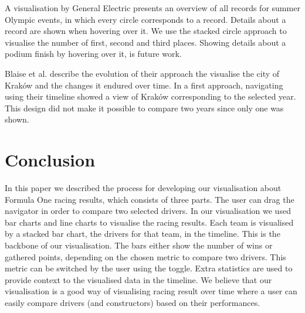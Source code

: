 \documentclass{sigchi}
\begin{document}
A visualisation by General Electric\cite{records} presents an overview of all records for summer Olympic events, in which every circle corresponds to a record. Details about a record are shown when hovering over it. We use the stacked circle approach to visualise the number of first, second and third places. Showing details about a podium finish by hovering over it, is future work.  

Blaise et al. \cite{blaise2008experimenting} describe the evolution of their approach the visualise the city of Krak\'ow and the changes it endured over time. In a first approach, navigating using their timeline showed a view of Krak\'ow corresponding to the selected year. This design did not make it possible to compare two years since only one was shown. 



\section{Conclusion} 

In this paper we described the process for developing our visualisation about Formula One racing results, which consists of three parts. The user can drag the navigator in order to compare two selected drivers. In our visualisation we used bar charts and line charts to visualise the racing results. Each team is visualised by a stacked bar chart, the drivers for that team, in the timeline. This is the backbone of our visualisation. The bars either show the number of wins or gathered points, depending on the chosen metric to compare two drivers. This metric can be switched by the user using the toggle. Extra statistics are used to provide context to the visualised data in the timeline. We believe that our visualisation is a good way of visualising racing result over time where a user can easily compare drivers (and constructors) based on their performances.





\end{document}
